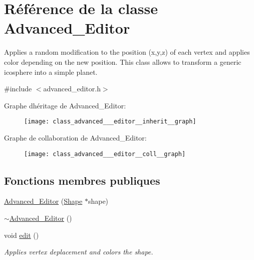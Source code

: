 \hypertarget{class_advanced___editor}{}\section{Référence de la classe Advanced\+\_\+\+Editor}
\label{class_advanced___editor}


Applies a random modification to the position (x,y,z) of each vertex and applies color depending on the new position. This class allows to transform a generic icosphere into a simple planet.  




{\ttfamily \#include $<$advanced\+\_\+editor.\+h$>$}



Graphe d\textquotesingle{}héritage de Advanced\+\_\+\+Editor\+:\nopagebreak
\begin{figure}[H]
\begin{center}
\leavevmode
\texttt{[image: class\_advanced\_\_\_editor\_\_inherit\_\_graph]}
\end{center}
\end{figure}


Graphe de collaboration de Advanced\+\_\+\+Editor\+:\nopagebreak
\begin{figure}[H]
\begin{center}
\leavevmode
\texttt{[image: class\_advanced\_\_\_editor\_\_coll\_\_graph]}
\end{center}
\end{figure}
\subsection*{Fonctions membres publiques}
\begin{DoxyCompactItemize}
\item 
\hyperlink{class_advanced___editor_a5727b0fb3127ff32135d4b0e39a605e5}{Advanced\+\_\+\+Editor} (\hyperlink{class_shape}{Shape} $\ast$shape)
\item 
\hyperlink{class_advanced___editor_ade8499e109f05ddbb4430f12a9cd12d2}{$\sim$\+Advanced\+\_\+\+Editor} ()
\item 
void \hyperlink{class_advanced___editor_afc51cb1199403cb6785bfd3d7e290a1b}{edit} ()
\begin{DoxyCompactList}\small\item\em Applies vertex deplacement and colors the shape. \end{DoxyCompactList}\end{DoxyCompactItemize}
